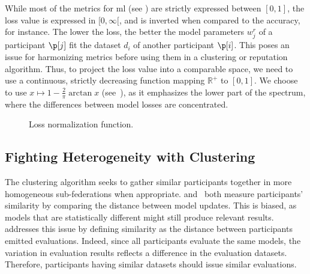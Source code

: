 While most of the metrics for \gls{ml} (see ) are strictly expressed between $[0,1]$, the loss value is expressed in $[0,\infty[$, and is inverted when compared to the accuracy, for instance.
The lower the loss, the better the model parameters $w_j^r$ of a participant $\p[j]$ fit the dataset $d_i$ of another participant $\p[i]$.
This poses an issue for harmonizing metrics before using them in a clustering or reputation algorithm.
Thus, to project the loss value into a comparable space, we need to use a continuous, strictly decreasing function mapping $\mathbb{R}^{+}$ to $[0,1]$.  
We choose to use $x \mapsto 1-\frac{2}{\pi}\arctan x $ (see~), as it emphasizes the lower part of the spectrum, where the differences between model losses are concentrated.

\begin{figure}
  \centering

  \caption{
    Loss normalization function.
    \label{fig:arctan}
  }
\end{figure}


\subsection{Fighting Heterogeneity with Clustering\label{sec:radar.archi.cluster}}

The clustering algorithm seeks to gather similar participants together in more homogeneous sub-federations when appropriate. 
\textcite{nguyen_FLAMETamingBackdoors_2022} and~\textcite{ye_PFedSAPersonalizedFederated_2023} both measure participants' similarity by comparing the distance between model updates. 
This is biased, as models that are statistically different might still produce relevant results. 
\thecontrib addresses this issue by defining similarity as the distance between participants emitted evaluations. 
Indeed, since all participants evaluate the same models, the variation in evaluation results reflects a difference in the evaluation datasets. 
Therefore, participants having similar datasets should issue similar evaluations. 

